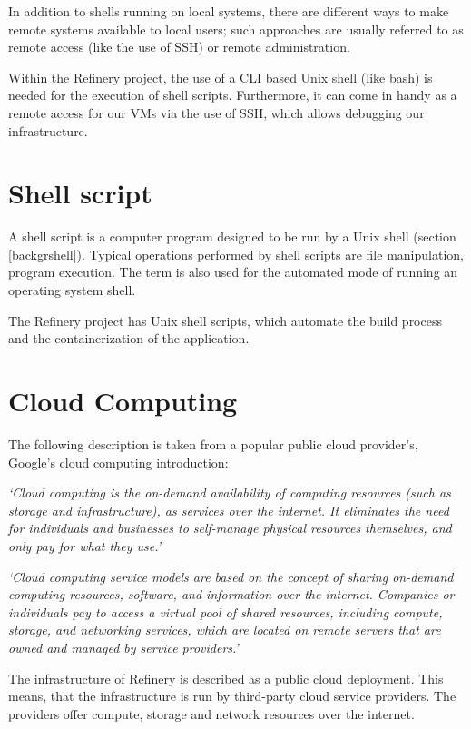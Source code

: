 	In addition to shells running on local systems, there are different ways to make remote 
	systems available to local users; such approaches are usually referred to as remote access (like the use of SSH) or remote administration.

	Within the Refinery project, the use of a CLI based Unix shell (like bash) is needed for the execution of shell scripts. Furthermore, it can come in handy 
	as a remote access for our VMs via the use of SSH, which allows debugging our infrastructure.

\section{Shell script} \label{backgrshellscript}
	A shell script \cite{shellscript} is a computer program designed to be run by a Unix shell (section \ref{backgrshell}). 
	Typical operations performed by shell scripts are file manipulation, program execution.
	The term is also used for the automated mode of running an operating system shell.

	The Refinery project has Unix shell scripts, which automate the build process and the containerization of the application.

\section{Cloud Computing} \label{backgrcloud}
	The following description is taken from a popular public cloud provider's, Google's cloud computing introduction:

	\textit{`Cloud computing \cite{cloud} is the on-demand availability of computing resources (such as storage and infrastructure), as services over the internet. 
	It eliminates the need for individuals and businesses to self-manage physical resources themselves, and only pay for what they use.'}

	\textit{`Cloud computing service models are based on the concept of sharing on-demand computing resources, software, and information over the internet. 
	Companies or individuals pay to access a virtual pool of shared resources, including compute, storage, and networking services, which are located on
	remote servers that are owned and managed by service providers.'}

	The infrastructure of Refinery is described as a public cloud deployment. 
	This means, that the infrastructure is run by third-party cloud service providers.
	The providers offer compute, storage and network resources over the internet. 

